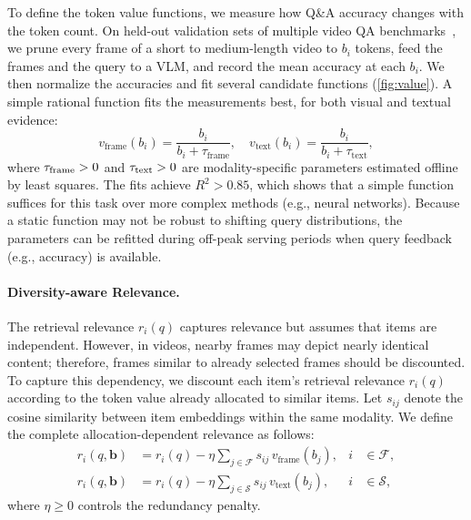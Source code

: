 To define the token value functions, we measure how Q\&A accuracy changes with the token count. On held-out validation sets of multiple video QA benchmarks~\cite{zhou2024mlvu,wu2024longvideobench,fu2024videomme}, we prune every frame of a short to medium-length video to $b_i$ tokens, feed the frames and the query to a VLM, and record the mean accuracy at each $b_i$. We then normalize the accuracies and fit several candidate functions (\cref{fig:value}). A simple rational function fits the measurements best, for both visual and textual evidence:
\begin{equation}
  v_{\text{frame}}(b_i)=\frac{b_i}{b_i+\tau_{\text{frame}}},\quad
  v_{\text{text}}(b_i)=\frac{b_i}{b_i+\tau_{\text{text}}},
  \label{eq:curve}
\end{equation}
where $\tau_{\rm frame}>0$ and $\tau_{\rm text}>0$ are modality-specific parameters estimated offline by least squares. The fits achieve $R^2>0.85$, which shows that a simple function suffices for this task over more complex methods (e.g., neural networks). Because a static function may not be robust to shifting query distributions, the parameters can be refitted during off-peak serving periods when query feedback (e.g., accuracy) is available.


\paragraph{Diversity-aware Relevance.}
The retrieval relevance $r_i(q)$ captures relevance but assumes that items are independent. However, in videos, nearby frames may depict nearly identical content; therefore, frames similar to already selected frames should be discounted. To capture this dependency, we discount each item's retrieval relevance $r_i(q)$ according to the token value already allocated to similar items. Let $s_{ij}$ denote the cosine similarity between item embeddings within the same modality. We define the complete allocation-dependent relevance as follows:
\begin{equation}
\begin{aligned}
  r_i(q,\mathbf b)&=r_i(q)-\eta\sum_{j\in\mathcal F}s_{ij}\,v_{\text{frame}}(b_j), & i&\in\mathcal F,\\
  r_i(q,\mathbf b)&=r_i(q)-\eta\sum_{j\in\mathcal S}s_{ij}\,v_{\text{text}}(b_j), & i&\in\mathcal S,
\end{aligned}
\label{eq:cond}
\end{equation}
where $\eta\geq0$ controls the redundancy penalty.

